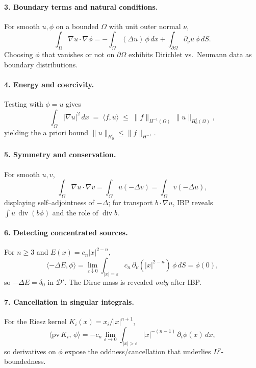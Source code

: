 \documentclass[12pt,a4paper]{article}
\theoremstyle{plain}
\theoremstyle{definition}
\theoremstyle{remark}
\theoremstyle{remark}
\begin{document}
\smallskip

\paragraph{3. Boundary terms and natural conditions.}
For smooth $u,\phi$ on a bounded $\Omega$ with unit outer normal $\nu$,
\[
\int_\Omega \nabla u\cdot\nabla\phi
= -\int_\Omega (\Delta u)\,\phi \,dx + \int_{\partial\Omega} \partial_\nu u\,\phi\,dS.
\]
Choosing $\phi$ that vanishes or not on $\partial\Omega$ exhibits Dirichlet vs.\ Neumann data as boundary distributions.

\smallskip

\paragraph{4. Energy and coercivity.}
Testing with $\phi=u$ gives
\[
\int_\Omega |\nabla u|^2\,dx \;=\; \langle f,u\rangle
\;\le\; \|f\|_{H^{-1}(\Omega)} \,\|u\|_{H_0^1(\Omega)},
\]
yielding the a priori bound $\|u\|_{H_0^1}\le \|f\|_{H^{-1}}$.

\smallskip

\paragraph{5. Symmetry and conservation.}
For smooth $u,v$,
\[
\int_\Omega \nabla u\cdot\nabla v
= \int_\Omega u(-\Delta v)
= \int_\Omega v(-\Delta u),
\]
displaying self--adjointness of $-\Delta$; for transport $b\cdot\nabla u$, IBP reveals $\int u\,\operatorname{div}(b\phi)$ and the role of $\operatorname{div}b$.

\smallskip

\paragraph{6. Detecting concentrated sources.}
For $n\ge3$ and $E(x)=c_n|x|^{2-n}$,
\[
\langle -\Delta E,\phi\rangle
= \lim_{\varepsilon\downarrow0}\!\!\int_{|x|=\varepsilon} c_n\,\partial_\nu(|x|^{2-n})\,\phi\,dS
= \phi(0),
\]
so $-\Delta E=\delta_0$ in $\mathcal D'$. The Dirac mass is revealed \emph{only} after IBP.

\smallskip

\paragraph{7. Cancellation in singular integrals.}
For the Riesz kernel $K_i(x)=x_i/|x|^{n+1}$,
\[
\Big\langle \mathrm{pv}\,K_i,\,\phi\Big\rangle
= -c_n \lim_{\varepsilon\to0}\int_{|x|>\varepsilon} |x|^{-(n-1)}\,\partial_i\phi(x)\,dx,
\]
so derivatives on $\phi$ expose the oddness/cancellation that underlies $L^p$-boundedness.
\end{document}

